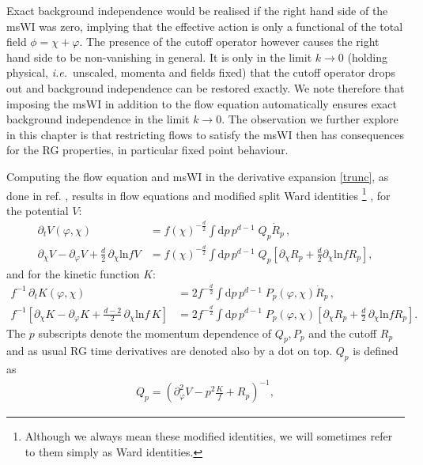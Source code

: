 \documentclass[11pt]{book} %
\newcommand\ie{\textit{i.e.}\ }
\newcommand{\vp}{\varphi}
\numberwithin{equation}{chapter}
\begin{document}
Exact background independence would be realised if the right hand side of the msWI was zero,
implying that the effective action is only a functional of the total field $\phi = \chi + \vp$.
The presence of the cutoff operator however causes the right hand side to be non-vanishing in general.
It is only in the limit $k\rightarrow0$ (holding physical, \ie unscaled,
momenta and fields fixed) that the cutoff operator drops out and background independence can be
restored exactly. We note therefore that imposing the msWI in addition to the flow equation
automatically ensures exact background independence in the limit $k\rightarrow0$.
The observation we further explore in this chapter is that restricting flows to
satisfy the msWI then has consequences for the RG properties,
in particular fixed point behaviour.

Computing the flow equation and msWI in the derivative expansion \eqref{trunc}, as done
in ref. \cite{Dietz:2015owa}, results in flow equations
and modified split Ward identities%
\footnote{
  Although we always mean these modified identities,
  we will sometimes refer to them  simply as Ward identities.
}%
, for the potential $V$:
\begin{align}
  \label{flowV}
  \partial_t V(\varphi,\chi)
  &= f(\chi)^{-\frac{d}{2}} \int \mathrm dp\, p^{d-1} \; Q_p \dot R_p \,, \\
  \label{msWIV}
  \partial_\chi V - \partial_\varphi V + \frac{d}{2} \, \partial_\chi \text{ln} f V
  &= f(\chi)^{-\frac{d}{2}} \int \mathrm dp\, p^{d-1} \; Q_p
  \left[
    \partial_\chi R_p + \frac{d}{2}\partial_\chi \text{ln} f  R_p
  \right] ,
\end{align}
and for the kinetic function $K$:
\begin{align}
  \label{flowK}
  f^{-1} \, \partial_t K(\varphi,\chi)
  &= 2 f^{-\frac{d}{2}} \int \mathrm dp \, p^{d-1} \; P_p(\varphi,\chi)\dot R_p \,,\\
  \label{msWIK}
  f^{-1}
  \left[
    \partial_\chi K- \partial_\varphi K + \frac{d-2}{2} \, \partial_\chi \text{ln}f \, K
  \right]
  &= 2 f^{-\frac{d}{2}} \int \mathrm dp \, p^{d-1} \; P_p(\varphi,\chi)
  \left[
    \partial_{\chi} R_p + \frac{d}{2} \, \partial_\chi \mathrm{ln} f R_p
  \right].
\end{align}
The $p$ subscripts denote the momentum dependence of $Q_p, P_p$ and the cutoff $R_p$ and as
usual RG time derivatives are denoted also by a dot on top. $Q_p$ is defined as
\begin{align}
	Q_p = \left( \partial^2_\varphi V - p^2\frac{K}{f} + R_p \right)^{-1} ,
	\label{Q}
\end{align}
\end{document}
